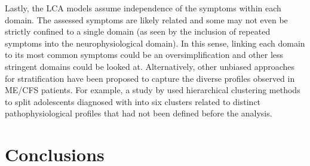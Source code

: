
Lastly, the LCA models assume independence of the symptoms within each domain.
The assessed symptoms are likely related and some may not even be strictly confined to a single domain (as seen by the inclusion of repeated symptoms into the neurophysiological domain).
In this sense, linking each domain to its most common symptoms could be an oversimplification and other less stringent domains could be looked at.
Alternatively, other unbiased approaches for stratification have been proposed to capture the diverse profiles observed in ME/CFS patients.
For example, a study by \citet{asprustenAreThereSubgroups2021} used hierarchical clustering methods to split adolescents diagnosed with \cfs into six clusters related to distinct pathophysiological profiles that had not been defined before the analysis.

\section{Conclusions}

